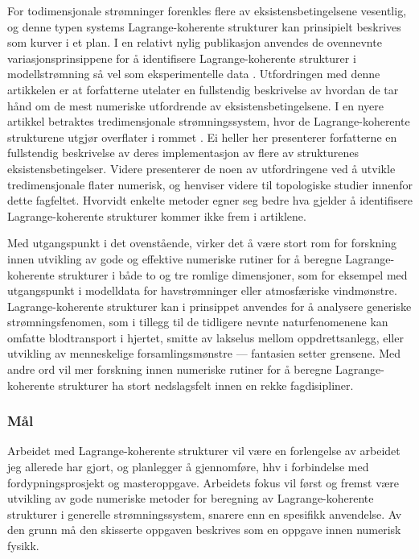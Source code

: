 For todimensjonale strømninger forenkles flere av eksistensbetingelsene
vesentlig, og denne typen systems Lagrange-koherente strukturer kan
prinsipielt beskrives som kurver i et plan. I en relativt nylig publikasjon
anvendes de ovennevnte variasjonsprinsippene for å identifisere
Lagrange-koherente strukturer i modellstrømning så vel som eksperimentelle data
\parencite{farazmand2012computing}. Utfordringen med denne artikkelen er at
forfatterne utelater en fullstendig beskrivelse av hvordan de tar hånd om
de mest numeriske utfordrende av eksistensbetingelsene. I en nyere artikkel
betraktes tredimensjonale strømningssystem, hvor de Lagrange-koherente
strukturene utgjør overflater i rommet \parencite{oettinger2016autonomous}.
Ei heller her presenterer forfatterne en fullstendig beskrivelse av deres
implementasjon av flere av strukturenes eksistensbetingelser. Videre presenterer
de noen av utfordringene ved å utvikle tredimensjonale flater numerisk, og
henviser videre til topologiske studier innenfor dette fagfeltet. Hvorvidt
enkelte metoder egner seg bedre hva gjelder å identifisere Lagrange-koherente
strukturer kommer ikke frem i artiklene.

Med utgangspunkt i det ovenstående, virker det å være stort rom for forskning
innen utvikling av gode og effektive numeriske rutiner for å beregne
Lagrange-koherente strukturer i både to og tre romlige dimensjoner, som for
eksempel med utgangspunkt i modelldata for havstrømninger eller atmosfæriske
vindmønstre. Lagrange-koherente strukturer kan i prinsippet anvendes for å
analysere generiske strømningsfenomen, som i tillegg til de tidligere nevnte
naturfenomenene kan omfatte blodtransport i hjertet, smitte av lakselus
mellom oppdrettsanlegg, eller utvikling av menneskelige forsamlingsmønstre ---
fantasien setter grensene. Med andre ord vil mer forskning innen numeriske
rutiner for å beregne Lagrange-koherente strukturer ha stort nedslagsfelt innen
en rekke fagdisipliner.

\subsubsection*{Mål}

Arbeidet med Lagrange-koherente strukturer vil være en forlengelse av
arbeidet jeg allerede har gjort, og planlegger å gjennomføre, hhv i forbindelse
med fordypningsprosjekt og masteroppgave. Arbeidets fokus vil først og fremst
være utvikling av gode numeriske metoder for beregning av Lagrange-koherente
strukturer i generelle strømningssystem, snarere enn en spesifikk anvendelse.
Av den grunn må den skisserte oppgaven beskrives som en oppgave innen numerisk
fysikk.

